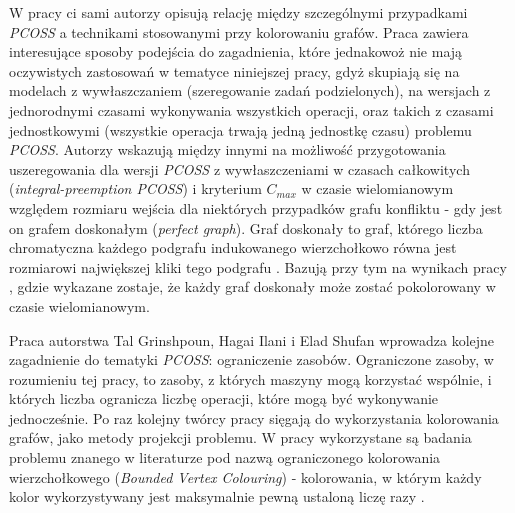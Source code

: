 \documentclass[brudnopis]{xmgr}
\begin{document}
W pracy \cite{ilani2016partially} ci sami autorzy opisują relację między szczególnymi przypadkami \emph{PCOSS} a technikami stosowanymi przy kolorowaniu grafów. Praca zawiera interesujące sposoby podejścia do zagadnienia, które jednakowoż nie mają oczywistych zastosowań w tematyce niniejszej pracy, gdyż skupiają się na modelach z wywłaszczaniem (szeregowanie zadań podzielonych), na wersjach z jednorodnymi czasami wykonywania wszystkich operacji, oraz takich z czasami jednostkowymi (wszystkie operacja trwają jedną jednostkę czasu) problemu \emph{PCOSS}. Autorzy wskazują między innymi na możliwość przygotowania uszeregowania dla wersji \emph{PCOSS} z wywłaszczeniami w czasach całkowitych (\emph{integral-preemption PCOSS}) i kryterium $C_{max}$ w czasie wielomianowym względem rozmiaru wejścia dla niektórych przypadków grafu konfliktu - gdy jest on grafem doskonałym (\emph{perfect graph}). Graf doskonały to graf, którego liczba chromatyczna każdego podgrafu indukowanego wierzchołkowo równa jest rozmiarowi największej kliki tego podgrafu \cite{diestel2010graph}. Bazują przy tym na wynikach pracy \cite{grotschel1984polynomial}, gdzie wykazane zostaje, że każdy graf doskonały może zostać pokolorowany w czasie wielomianowym.
\medskip

Praca \cite{ilani2018partially} autorstwa Tal Grinshpoun, Hagai Ilani i Elad Shufan wprowadza kolejne zagadnienie do tematyki \emph{PCOSS}: ograniczenie zasobów. Ograniczone zasoby, w rozumieniu tej pracy, to zasoby, z których maszyny mogą korzystać wspólnie, i których liczba ogranicza liczbę operacji, które mogą być wykonywanie jednocześnie. Po raz kolejny twórcy pracy sięgają do wykorzystania kolorowania grafów, jako metody projekcji problemu. W pracy wykorzystane są badania problemu znanego w literaturze pod nazwą ograniczonego kolorowania wierzchołkowego (\emph{Bounded Vertex Colouring}) - kolorowania, w którym każdy kolor wykorzystywany jest maksymalnie pewną ustaloną liczę razy \cite{hansen1993bounded}.



\end{document}
